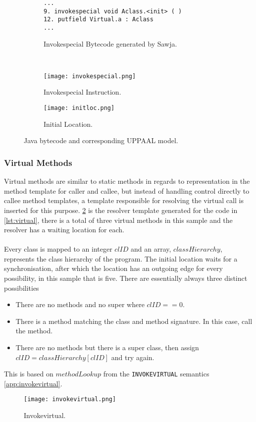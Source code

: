 \begin{figure}
\centering
\begin{subfigure}{\textwidth}
  \begin{lstlisting}
...
9. invokespecial void Aclass.<init> ( )
12. putfield Virtual.a : Aclass
...
  \end{lstlisting}
  \caption{Invokespecial Bytecode generated by Sawja.}
\end{subfigure} \\
\begin{subfigure}{.65\textwidth}
  \texttt{[image: invokespecial.png]}
  \caption{Invokespecial Instruction.}
\end{subfigure}
\hspace{10px}
\begin{subfigure}{.25\textwidth}
  \texttt{[image: initloc.png]}
  \caption{Initial Location.}
\end{subfigure}
\caption{Java bytecode and corresponding UPPAAL model.}
\label{fig:invokespecial}
\end{figure}


\subsubsection{Virtual Methods}
Virtual methods are similar to static methods in regards to representation in the method template for caller and callee, but instead of handling control directly to callee method templates, a template responsible for resolving the virtual call is inserted for this purpose.
\cref{fig:invokevirtual} is the resolver template generated for the code in \cref{lst:virtual}, there is a total of three virtual methods in this sample and the resolver has a waiting location for each.\\\\
Every class is mapped to an integer $clID$ and an array, $classHierarchy$, represents the class hierarchy of the program. The initial location  waits for a synchronisation, after which the location  has an outgoing edge for every possibility, in this sample that is five. There are essentially always three distinct possibilities 

\begin{itemize}
\item There are no methods and no super where $clID == 0$.
\item There is a method matching the class and method signature. In this case, call the method.
\item There are no methods but there is a super class, then assign $clID = classHierarchy[clID]$ and try again.
\end{itemize}

This is based on $methodLookup$ from the \texttt{INVOKEVIRTUAL} semantics \cref{app:invokevirtual}.

 
\begin{figure}[H]
\centering
\texttt{[image: invokevirtual.png]}
\caption{Invokevirtual.}
\label{fig:invokevirtual}
\end{figure}




